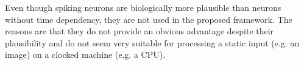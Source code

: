 Even though spiking neurons are biologically more plausible than neurons without time dependency, they are not used in the proposed framework.
The reasons are that they do not provide an obvious advantage despite their plausibility and do not seem very suitable for processing a static input (e.g. an image) on a clocked machine (e.g. a CPU).




